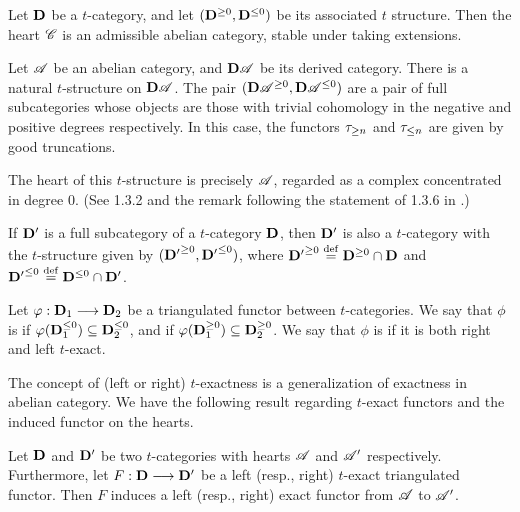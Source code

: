 \begin{thm}\label{thm_heart_is_abel_cat}
Let $\DCat$ be a $t$-category, and let $(\DCat^{\geq 0}, 
\DCat^{\leq 0})$ be its associated $t$ structure. Then the heart 
$\Cat{C}$ is an admissible abelian category, stable under
taking extensions. 
\end{thm}

\begin{ex}\label{ex_DA_t_struct}
Let $\Cat{A}$ be an abelian category, and $\DCat[D]\Cat{A}$ be its
derived category. There is a natural $t$-structure on 
$\DCat[D]\Cat{A}$. The pair $(\DCat[D]\Cat{A}^{\geq 0}, 
\DCat[D]\Cat{A}^{\leq 0})$ are a pair of full subcategories whose
objects are those with trivial cohomology in the negative and 
positive degrees respectively. In this case, the functors 
$\ggtrunc{n}$ and $\gltrunc{n}$ are given by good truncations. 

The heart of this $t$-structure is precisely $\Cat{A}$, regarded
as a complex concentrated in degree $0$. (See 1.3.2 and the remark
following the statement of 1.3.6 in \cite{BBD}.)
\end{ex}

\begin{ex}
If $\DCat'$ is a full subcategory of a $t$-category $\DCat$, then
$\DCat'$ is also a $t$-category with the $t$-structure given by
$({\DCat'}^{\geq 0}, {\DCat'}^{\leq 0})$, where ${\DCat'}^{\geq 0} 
\defeq \DCat^{\geq 0} \cap \DCat$ and ${\DCat'}^{\leq 0} \defeq 
\DCat^{\leq 0} \cap \DCat'$. 
\end{ex}

\begin{defn}
Let $\phi: \DCat_1 \to \DCat_2$ be a triangulated functor between
$t$-categories. We say that $\phi$ is  if 
$\phi(\DCat_1^{\leq 0}) \subseteq \DCat_2^{\leq 0}$, and  
 if $\phi(\DCat_1^{\geq 0}) \subseteq 
\DCat_2^{\geq 0}$. We say that $\phi$ is  
if it is both right and left $t$-exact.
\end{defn}

The concept of (left or right) $t$-exactness is a generalization 
of exactness in abelian category. We have the following result
regarding $t$-exact functors and the induced functor on the
hearts.

\begin{prop}\label{prop_t_exact_implies_exact}
Let $\DCat$ and $\DCat'$ be two $t$-categories with hearts 
$\Cat{A}$ and $\Cat{A}'$ respectively. Furthermore, let $F: 
\DCat \to \DCat'$ be a left (resp., right) $t$-exact triangulated 
functor. Then $F$ induces a left (resp., right) exact 
functor from $\Cat{A}$ to $\Cat{A}'$.
\end{prop}

